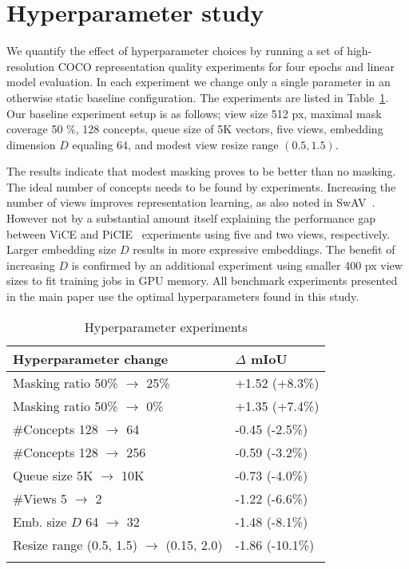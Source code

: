 \documentclass{bmvc2k}
\begin{document}
\section{Hyperparameter study}

We quantify the effect of hyperparameter choices by running a set of high-resolution COCO representation quality experiments for four epochs and linear model evaluation. In each experiment we change only a single parameter in an otherwise static baseline configuration. The experiments are listed in Table~\ref{tab:hyperparam_exp}. Our baseline experiment setup is as follows; view size 512 px, maximal mask coverage 50 $\%$, 128 concepts, queue size of 5K vectors, five views, embedding dimension $D$ equaling 64, and modest view resize range $(0.5, 1.5)$.

The results indicate that modest masking proves to be better than no masking. The ideal number of concepts needs to be found by experiments. Increasing the number of views improves representation learning, as also noted in SwAV~\cite{Caron2020SwAV}. However not by a substantial amount itself explaining the performance gap between ViCE and PiCIE~\cite{Cho2021PiCIE} experiments using five and two views, respectively. Larger embedding size $D$ results in more expressive embeddings. The benefit of increasing $D$ is confirmed by an additional experiment using smaller 400 px view sizes to fit training jobs in GPU memory. All benchmark experiments presented in the main paper use the optimal hyperparameters found in this study.

\setlength{\tabcolsep}{4pt}
\begin{table}
\begin{center}
\caption{Hyperparameter experiments}
\begin{tabular}{ll}
\hline\noalign{\smallskip}
Hyperparameter change & $\Delta$ mIoU\\ \hline
\noalign{\smallskip}
Masking ratio 50\% $\rightarrow$ 25\%                   & +1.52 (+8.3\%)                   \\
Masking ratio 50\% $\rightarrow$ 0\%                    & +1.35 (+7.4\%)                   \\
\#Concepts 128 $\rightarrow$ 64                           & -0.45 (-2.5\%)                   \\
\#Concepts 128 $\rightarrow$ 256                          & -0.59 (-3.2\%)                   \\
Queue size 5K $\rightarrow$ 10K                             & -0.73 (-4.0\%)                   \\
\#Views 5 $\rightarrow$ 2                                 & -1.22 (-6.6\%)                   \\
Emb. size $D$ 64 $\rightarrow$ 32                                 & -1.48 (-8.1\%)                   \\
Resize range (0.5, 1.5) $\rightarrow$ (0.15, 2.0) & -1.86 (-10.1\%)  \\ \hline
\label{tab:hyperparam_exp}
\end{tabular}
\end{center}
\end{table}
\setlength{\tabcolsep}{1.4pt}
\end{document}
